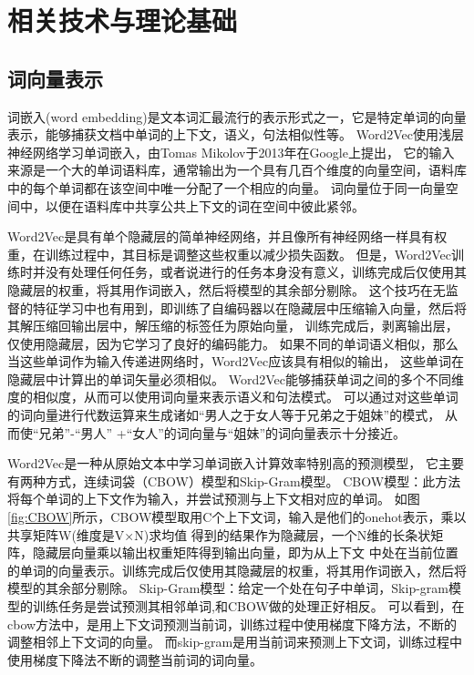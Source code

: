 \chapter{相关技术与理论基础}

\section{词向量表示}

词嵌入(word embedding)是文本词汇最流行的表示形式之一，它是特定单词的向量表示，能够捕获文档中单词的上下文，语义，句法相似性等。
Word2Vec使用浅层神经网络学习单词嵌入，由Tomas Mikolov于2013年在Google上提出\cite{mikolov2013distributed}，
它的输入来源是一个大的单词语料库，通常输出为一个具有几百个维度的向量空间，语料库中的每个单词都在该空间中唯一分配了一个相应的向量。 
词向量位于同一向量空间中，以便在语料库中共享公共上下文的词在空间中彼此紧邻。 

  Word2Vec是具有单个隐藏层的简单神经网络，并且像所有神经网络一样具有权重，在训练过程中，其目标是调整这些权重以减少损失函数。 
  但是，Word2Vec训练时并没有处理任何任务，或者说进行的任务本身没有意义，训练完成后仅使用其隐藏层的权重，将其用作词嵌入，然后将模型的其余部分剔除。
  这个技巧在无监督的特征学习中也有用到，即训练了自编码器以在隐藏层中压缩输入向量，然后将其解压缩回输出层中，解压缩的标签任为原始向量，
  训练完成后，剥离输出层，仅使用隐藏层，因为它学习了良好的编码能力。
  如果不同的单词语义相似，那么当这些单词作为输入传递进网络时，Word2Vec应该具有相似的输出，
  这些单词在隐藏层中计算出的单词矢量必须相似。
Word2Vec能够捕获单词之间的多个不同维度的相似度，从而可以使用词向量来表示语义和句法模式。
可以通过对这些单词的词向量进行代数运算来生成诸如“男人之于女人等于兄弟之于姐妹”的模式，
从而使“兄弟”-“男人” +“女人”的词向量与“姐妹”的词向量表示十分接近。

Word2Vec是一种从原始文本中学习单词嵌入计算效率特别高的预测模型，
它主要有两种方式，连续词袋（CBOW）模型和Skip-Gram模型。
CBOW模型：此方法将每个单词的上下文作为输入，并尝试预测与上下文相对应的单词。
如图\ref{fig:CBOW}所示，CBOW模型取用C个上下文词，输入是他们的onehot表示，乘以共享矩阵W(维度是V×N)求均值
得到的结果作为隐藏层，一个N维的长条状矩阵，隐藏层向量乘以输出权重矩阵得到输出向量，即为从上下文
中处在当前位置的单词的向量表示。训练完成后仅使用其隐藏层的权重，将其用作词嵌入，然后将模型的其余部分剔除。
Skip-Gram模型：给定一个处在句子中单词，Skip-gram模型的训练任务是尝试预测其相邻单词,和CBOW做的处理正好相反。
可以看到，在cbow方法中，是用上下文词预测当前词，训练过程中使用梯度下降方法，不断的调整相邻上下文词的向量。
而skip-gram是用当前词来预测上下文词，训练过程中使用梯度下降法不断的调整当前词的词向量。

